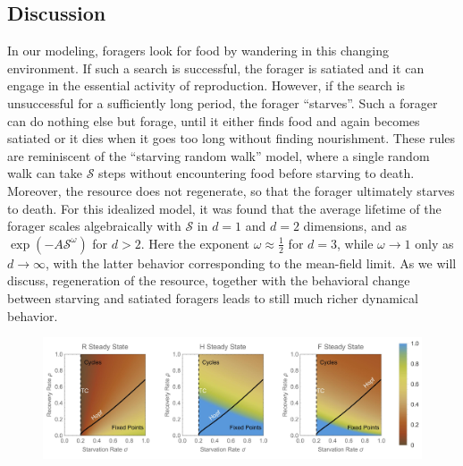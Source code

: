 \documentclass[12pt,english]{article}
\begin{document}
\begin{spacing}{1.9}



\section{Discussion}




In our modeling, foragers look for food by wandering in this changing
environment.  If such a search is successful, the forager is satiated and it
can engage in the essential activity of reproduction.  However, if the search
is unsuccessful for a sufficiently long period, the forager ``starves''.
Such a forager can do nothing else but forage, until it either finds food and
again becomes satiated or it dies when it goes too long without finding
nourishment.  These rules are reminiscent of the ``starving random walk''
model, where a single random walk can take $\mathcal{S}$ steps without
encountering food before starving to death.  Moreover, the resource does not
regenerate, so that the forager ultimately starves to death.  For this
idealized model, it was found that the average lifetime of the forager scales
algebraically with $\mathcal{S}$ in $d\!=\!1$ and $d\!=\!2$ dimensions, and
as $\exp(-A\mathcal{S}^\omega)$ for $d>2$.  Here the exponent
$\omega\approx \frac{1}{2}$ for $d=3$, while $\omega\to 1$ only as
$d\to \infty$, with the latter behavior corresponding to the mean-field
limit.  As we will discuss, regeneration of the resource, together with the
behavioral change between starving and satiated foragers leads to still much
richer dynamical behavior.



%

 \begin{figure}[h]
 	\centering
 	\includegraphics[width=1\textwidth]{fig_HopfFP.jpg}
 	\caption{
 	}
 	\label{Hopfb}
 \end{figure}



\end{spacing}
\end{document}
